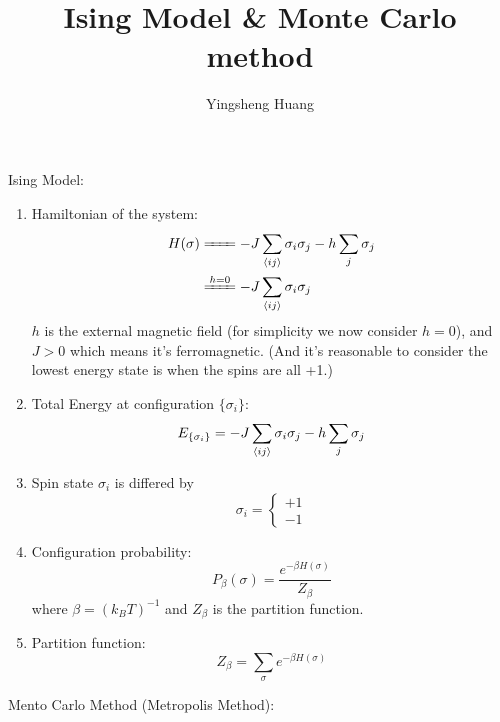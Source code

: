 \documentclass{article}
\title{Ising Model \& Monte Carlo method}
\author{Yingsheng Huang}
\newcommand{\s}{\sigma}
\begin{document}
\maketitle
Ising Model:
\begin{enumerate}
  \item Hamiltonian of the system:
  \begin{align*}
    H(\sigma)&\xlongequal{\phantom{h=0}}-J\sum_{\expval{ij}}\sigma_i\sigma_j-h\sum_{j}\sigma_j\\
    &\xlongequal{h=0}-J\sum_{\expval{ij}}\sigma_i\sigma_j
  \end{align*}
  $h$ is the external magnetic field (for simplicity we now consider $h=0$), and $J>0$ which means it's ferromagnetic. (And it's reasonable to consider the lowest energy state is when the spins are all +1.)
  \item Total Energy at configuration $\{\sigma_i \}$:
  $$E_{\{\sigma_i\}}=-J\sum_{\expval{ij}}\sigma_i\sigma_j-h\sum_{j}\sigma_j$$
  \item Spin state $\sigma_i$ is differed by
  $$\sigma_i=\begin{cases}
  +1\\-1
  \end{cases}$$
  \item Configuration probability:
  $$P_{\beta}(\s)=\frac{e^{-\beta H(\s)}}{Z_{\beta}}$$
  where $\beta=(k_BT)^{-1}$ and $Z_{\beta}$ is the partition function.
  \item Partition function:
  $$Z_{\beta}=\sum_{\sigma}e^{-\beta H(\sigma)}$$
\end{enumerate}
Mento Carlo Method (Metropolis Method):
\end{document}
